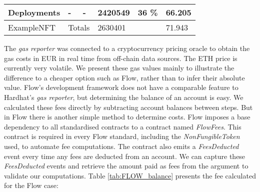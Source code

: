 \documentclass[../NFTComp_IEEE.tex]{subfiles}
\begin{document}
\begin{table}[ht]
{\begin{tabular}{|ll|ll|l|ll|}
            \multicolumn{2}{|l|}{Deployments}          & \multicolumn{1}{l|}{-}                                                            & -                          & 2420549                                                                           & \multicolumn{1}{l|}{36 \%} & 66.205                                    \\ \hline
            \multicolumn{2}{|l|}{ExampleNFT}           & \multicolumn{2}{l|}{Totals}                                                       & 2630401                    & \multicolumn{1}{l|}{}                                                             & 71.943                                                                 \\ \hline
        \end{tabular}%
    }
\end{table}

The \textit{gas reporter} was connected to a cryptocurrency pricing oracle to obtain the gas costs in EUR in real time from off-chain data sources. The ETH price is currently very volatile. We present these gas values mainly to illustrate the difference to a cheaper option such as Flow, rather than to infer their absolute value. Flow's development framework does not have a comparable feature to Hardhat's \textit{gas reporter}, but determining the balance of an account is easy. We calculated these fees directly by subtracting account balances between steps. But in Flow there is another simple method to determine costs. Flow imposes a base dependency to all standardised contracts to a contract named \textit{FlowFees}. This contract is required in every Flow standard, including the \textit{NonFungibleToken} used, to automate fee computations. The contract also emits a \textit{FeesDeducted} event every time any fees are deducted from an account. We can capture these \textit{FeesDeducted} events and retrieve the amount paid as fees from the argument to validate our computations. Table \ref{tab:FLOW_balance} presents the fee calculated for the Flow case:
\end{document}
